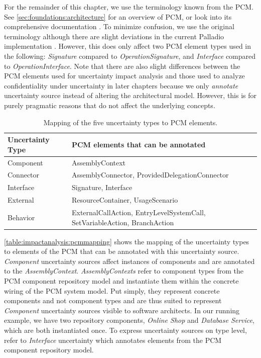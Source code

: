 For the remainder of this chapter, we use the terminology known from the \ac{PCM}.
See \autoref{sec:foundations:architecture} for an overview of \ac{PCM}, or look into its comprehensive documentation \cite{reussner_modeling_2016,becker_palladio_2009,reussner_palladio_2011}.
To minimize confusion, we use the original terminology \cite{reussner_palladio_2011,reussner_modeling_2016} although there are slight deviations in the current Palladio implementation \cite{reussner_palladio_2024}.
However, this does only affect two \ac{PCM} element types used in the following: \emph{Signature} compared to \emph{OperationSignature}, and \emph{Interface} compared to \emph{OperationInterface}.
Note that there are also slight differences between the \ac{PCM} elements used for uncertainty impact analysis and those used to analyze confidentiality under uncertainty in later chapters because we only \emph{annotate} uncertainty source instead of altering the architectural model.
However, this is for purely pragmatic reasons that do not affect the underlying concepts.

\begin{table}
    \centering
    \begin{tabularx}{\linewidth}{lX}
        \toprule
        Uncertainty Type \,         & \ac{PCM} elements that can be annotated \\
        \midrule
        Component          & AssemblyContext \\
        Connector        & AssemblyConnector, ProvidedDelegationConnector \\
        Interface          & Signature, Interface \\
        External            & ResourceContainer, UsageScenario \\
        Behavior          & ExternalCallAction, EntryLevelSystemCall, SetVariableAction, BranchAction \\
        \bottomrule
    \end{tabularx}
    \caption{Mapping of the five uncertainty types to \acf*{PCM} elements.}%
    \label{table:impactanalysis:pcmmapping}
\end{table}

\autoref{table:impactanalysis:pcmmapping} shows the mapping of the uncertainty types to elements of the \ac{PCM} that can be annotated with this uncertainty source.
\emph{Component} uncertainty sources affect instances of components and are annotated to the \emph{AssemblyContext}.
\emph{AssemblyContexts} refer to component types from the \ac{PCM} component repository model and instantiate them within the concrete wiring of the \ac{PCM} system model.
Put simply, they represent concrete components and not component types and are thus suited to represent \emph{Component} uncertainty sources visible to software architects.
In our running example, we have two repository components, \emph{Online Shop} and \emph{Database Service}, which are both instantiated once.
To express uncertainty sources on type level, refer to \emph{Interface} uncertainty which annotates elements from the \ac{PCM} component repository model.

